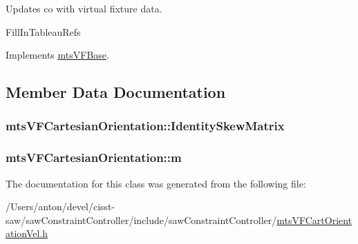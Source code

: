 Updates co with virtual fixture data. 

Fill\+In\+Tableau\+Refs 

Implements \hyperlink{classmts_v_f_base_aef5a28675f79945766a2b114c957ae6f}{mts\+V\+F\+Base}.



\subsection{Member Data Documentation}
\hypertarget{classmts_v_f_cartesian_orientation_a591d914dd2e7eb01503dc01823ed0c73}{}
\subsubsection[{Identity\+Skew\+Matrix}]{ mts\+V\+F\+Cartesian\+Orientation\+::\+Identity\+Skew\+Matrix}\label{classmts_v_f_cartesian_orientation_a591d914dd2e7eb01503dc01823ed0c73}
\hypertarget{classmts_v_f_cartesian_orientation_a9734c48a17ee90633f1114ad980560c2}{}
\subsubsection[{m}]{ mts\+V\+F\+Cartesian\+Orientation\+::m}\label{classmts_v_f_cartesian_orientation_a9734c48a17ee90633f1114ad980560c2}


The documentation for this class was generated from the following file\+:\begin{DoxyCompactItemize}
\item 
/\+Users/anton/devel/cisst-\/saw/saw\+Constraint\+Controller/include/saw\+Constraint\+Controller/\hyperlink{mts_v_f_cart_orientation_vel_8h}{mts\+V\+F\+Cart\+Orientation\+Vel.\+h}\end{DoxyCompactItemize}
